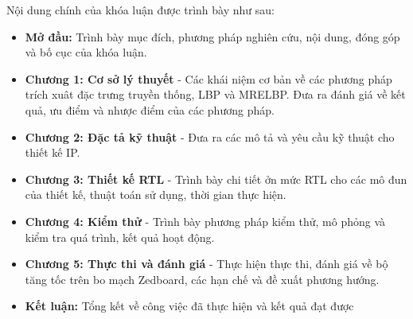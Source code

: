 \vspace{0.5cm}

Nội dung chính của khóa luận được trình bày như sau:

\renewcommand{\labelitemi}{$-$}
\begin{itemize}
	\item \textbf{Mở đầu:} Trình bày mục đích, phương pháp nghiên cứu, nội dung, đóng góp và bố cục của khóa luận.
	\item \textbf{Chương 1: Cơ sở lý thuyết} - Các khái niệm cơ bản về các phương pháp trích xuât đặc trưng truyền thống, LBP và MRELBP. Đưa ra đánh giá về kết quả, ưu điểm và nhược điểm của các phương pháp.
    \item  \textbf{Chương 2: Đặc tả kỹ thuật} - Đưa ra các mô tả và yêu cầu kỹ thuật cho thiết kế IP.
	\item  \textbf{Chương 3: Thiết kế RTL} - Trình bày chi tiết ởn mức RTL cho các mô đun của thiết kế, thuật toán sử dụng, thời gian thực hiện.
    
	\item\textbf{Chương 4: Kiểm thử} - Trình bày phương pháp kiểm thử, mô phỏng và kiểm tra quá trình, kết quả hoạt động.
	\item  \textbf{Chương 5: Thực thi và đánh giá} - Thực hiện thực thi, đánh giá về bộ tăng tốc trên bo mạch Zedboard, các hạn chế và đề xuất phương hướng. 
    \item \textbf{Kết luận: }Tổng kết về công việc đã thực hiện và kết quả đạt được
\end{itemize} 